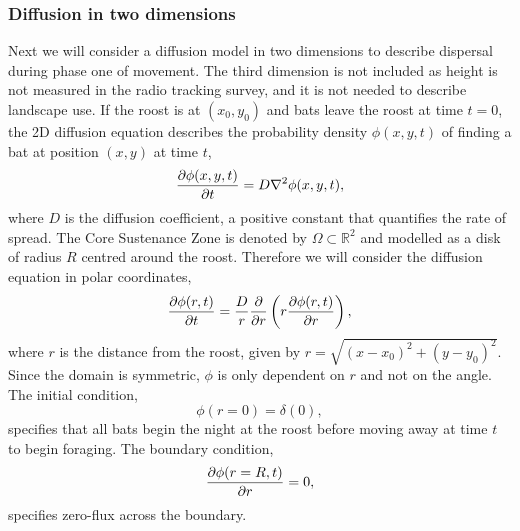 \subsubsection{Diffusion in two dimensions}

Next we will consider a diffusion model in two dimensions to
describe dispersal during phase one of movement. The third dimension is not
included as height is not measured in the radio tracking survey, and it is not
needed to describe landscape use.
If the roost is at $(x_0,y_0)$ and bats leave the roost at time $t =0$,
the 2D diffusion equation describes the probability density $\phi(x,y,t)$ of
finding a bat at position $(x,y)$ at time $t$,
%
\begin{equation}
  \frac{\partial \phi(x,y,t)}{\partial t} = D \nabla^2 \phi(x,y,t) ,
  \label{eqn:diffusion_cartesian2d}
\end{equation}
%
where $D$ is the diffusion coefficient, a positive constant that quantifies the
 rate of spread. The Core Sustenance Zone is denoted by $\Omega \subset \mathbb{R}^2$ and modelled as a disk of radius $R$ centred around the roost. Therefore we will consider the diffusion equation in polar coordinates,
 \begin{equation}
 \frac{\partial  \phi(r,t)}{\partial t} = \frac{D}{r} \frac{\partial }{\partial  r} \left( r \frac{\partial \phi(r,t)}{\partial r} \right),
 \label{eqn:diffusion_polar2d}
 \end{equation}
 where $r$ is the distance from the roost, given by $r=\sqrt{(x-x_0)^2 +
 (y-y_0)^2}$. Since the domain is symmetric, $\phi$ is only dependent on $r$ and not
  on the angle. The initial condition,
%
 \begin{equation}
 \phi(r = 0) = \delta(0),
 \label{eqn:IC2d}
 \end{equation}
%
specifies that all bats begin the night at the roost before moving away at time $t$ to begin foraging. The boundary condition,
%
\begin{equation}
\frac{\partial \phi(r=R,t)}{\partial r} = 0,
\label{eqn:BC}
\end{equation}
%
specifies zero-flux across the boundary.


